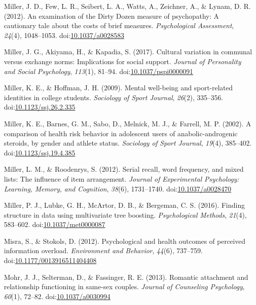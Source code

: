 \documentclass[english,man]{apa6}
\theoremstyle{definition}
\theoremstyle{definition}
\theoremstyle{definition}
\theoremstyle{remark}
\begin{document}
\hypertarget{ref-Miller2012a}{}
Miller, J. D., Few, L. R., Seibert, L. A., Watts, A., Zeichner, A., \&
Lynam, D. R. (2012). An examination of the Dirty Dozen measure of
psychopathy: A cautionary tale about the costs of brief measures.
\emph{Psychological Assessment}, \emph{24}(4), 1048--1053.
doi:\href{https://doi.org/10.1037/a0028583}{10.1037/a0028583}

\hypertarget{ref-Miller2017a}{}
Miller, J. G., Akiyama, H., \& Kapadia, S. (2017). Cultural variation in
communal versus exchange norms: Implications for social support.
\emph{Journal of Personality and Social Psychology}, \emph{113}(1),
81--94.
doi:\href{https://doi.org/10.1037/pspi0000091}{10.1037/pspi0000091}

\hypertarget{ref-Miller2009}{}
Miller, K. E., \& Hoffman, J. H. (2009). Mental well-being and
sport-related identities in college students. \emph{Sociology of Sport
Journal}, \emph{26}(2), 335--356.
doi:\href{https://doi.org/10.1123/ssj.26.2.335}{10.1123/ssj.26.2.335}

\hypertarget{ref-Miller2002}{}
Miller, K. E., Barnes, G. M., Sabo, D., Melnick, M. J., \& Farrell, M.
P. (2002). A comparison of health risk behavior in adolescent users of
anabolic-androgenic steroids, by gender and athlete status.
\emph{Sociology of Sport Journal}, \emph{19}(4), 385--402.
doi:\href{https://doi.org/10.1123/ssj.19.4.385}{10.1123/ssj.19.4.385}

\hypertarget{ref-Miller2012}{}
Miller, L. M., \& Roodenrys, S. (2012). Serial recall, word frequency,
and mixed lists: The influence of item arrangement. \emph{Journal of
Experimental Psychology: Learning, Memory, and Cognition}, \emph{38}(6),
1731--1740.
doi:\href{https://doi.org/10.1037/a0028470}{10.1037/a0028470}

\hypertarget{ref-Miller2016}{}
Miller, P. J., Lubke, G. H., McArtor, D. B., \& Bergeman, C. S. (2016).
Finding structure in data using multivariate tree boosting.
\emph{Psychological Methods}, \emph{21}(4), 583--602.
doi:\href{https://doi.org/10.1037/met0000087}{10.1037/met0000087}

\hypertarget{ref-Misra2012}{}
Misra, S., \& Stokols, D. (2012). Psychological and health outcomes of
perceived information overload. \emph{Environment and Behavior},
\emph{44}(6), 737--759.
doi:\href{https://doi.org/10.1177/0013916511404408}{10.1177/0013916511404408}

\hypertarget{ref-Mohr2013}{}
Mohr, J. J., Selterman, D., \& Fassinger, R. E. (2013). Romantic
attachment and relationship functioning in same-sex couples.
\emph{Journal of Counseling Psychology}, \emph{60}(1), 72--82.
doi:\href{https://doi.org/10.1037/a0030994}{10.1037/a0030994}
\end{document}
